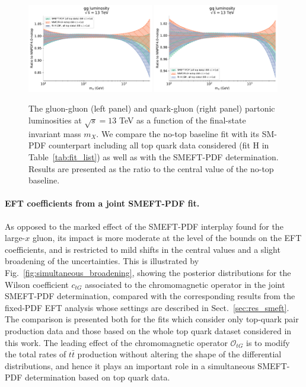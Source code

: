 \documentclass[withindex,glossary]{cam-thesis}
\begin{document}
\begin{figure}[H]
\centering
\includegraphics[width=0.49\textwidth]{smeft_plots/SIMU_lumi_comparison_gg.pdf}
\includegraphics[width=0.49\textwidth]{smeft_plots/SIMU_lumi_comparison_gq.pdf}
\caption{The gluon-gluon (left panel) and quark-gluon (right panel)
  partonic luminosities at $\sqrt{s}=13$ TeV as a function of the final-state
  invariant mass $m_X$.
  We compare the no-top baseline fit with its SM-PDF counterpart
  including all top quark data considered (fit H in Table~\ref{tab:fit_list}) as well as with
  the SMEFT-PDF determination.
  Results are presented as the ratio to the central value of the
  no-top baseline.
}
\label{fig:simu_luminosities}
\end{figure}

\paragraph{EFT coefficients from a joint SMEFT-PDF fit.} 
As opposed to the marked effect of the SMEFT-PDF interplay found for the large-$x$ gluon,
its impact is more moderate at the level of the bounds on the EFT coefficients,
and is restricted to mild shifts in the central values and a slight broadening
of the uncertainties.
%
This is illustrated by Fig.~\ref{fig:simultaneous_broadening},
showing the posterior distributions for the Wilson coefficient $c_{tG}$
  associated to the chromomagnetic operator in the joint SMEFT-PDF determination, compared
  with the corresponding results from the fixed-PDF EFT analysis whose settings are described in
  Sect.~\ref{sec:res_smeft}.
  The comparison is presented both for the fits which consider only top-quark pair production data
  and those based on the whole top quark dataset considered in this work.
  The leading effect of the chromomagnetic operator $\mathcal{O}_{tG}$ is to modify the
  total rates of 
  $t \bar{t}$ production without altering the shape of the differential distributions, and hence
  it plays an important role in a simultaneous SMEFT-PDF determination based on top quark data.
\end{document}
